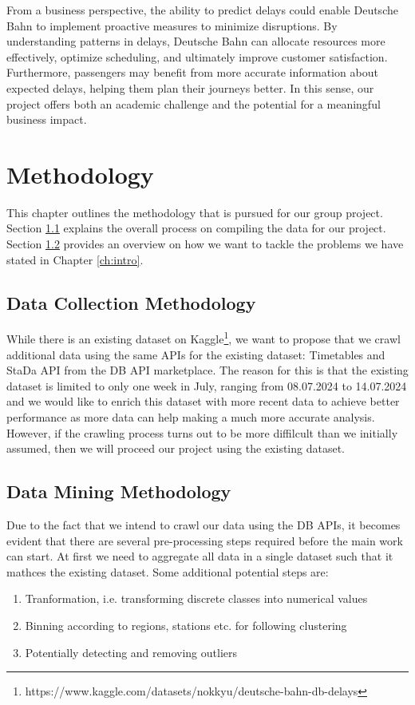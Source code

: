 \documentclass[a4paper,oneside,bibliography=totoc]{scrbook}
\begin{document}
From a business perspective, the ability to predict delays could enable Deutsche Bahn to implement proactive measures to minimize disruptions. By understanding patterns in delays, Deutsche Bahn can allocate resources more effectively, optimize scheduling, and ultimately improve customer satisfaction. Furthermore, passengers may benefit from more accurate information about expected delays, helping them plan their journeys better. In this sense, our project offers both an academic challenge and the potential for a meaningful business impact.

\chapter{Methodology}
\label{ch:methodology}
This chapter outlines the methodology that is pursued for our group project. Section \ref{sec:dataset} explains the overall process on compiling the data for our project. Section \ref{sec:data-mining-methodology} provides an overview on how we want to tackle the problems we have stated in Chapter \ref{ch:intro}.
\section{Data Collection Methodology}\label{sec:dataset}
While there is an existing dataset on Kaggle\footnote{https://www.kaggle.com/datasets/nokkyu/deutsche-bahn-db-delays}, we want to propose that we crawl additional data using the same APIs for the existing dataset: Timetables and StaDa API from the DB API marketplace.
The reason for this is that the existing dataset is limited to only one week in July, ranging from 08.07.2024 to 14.07.2024 and we would like to enrich this dataset with more recent data to achieve better performance as more data can help making a much more accurate analysis.
However, if the crawling process turns out to be more diffilcult than we initially assumed, then we will proceed our project using the existing dataset.

\section{Data Mining Methodology}\label{sec:data-mining-methodology}
Due to the fact that we intend to crawl our data using the DB APIs, it becomes evident that there are several pre-processing steps required before the main work can start. At first we need to aggregate all data in a single dataset such that it mathces the existing dataset.
Some additional potential steps are:
\begin{enumerate}
  \item Tranformation, i.e. transforming discrete classes into numerical values
  \item Binning according to regions, stations etc. for following clustering
  \item Potentially detecting and removing outliers
\end{enumerate}
\end{document}
